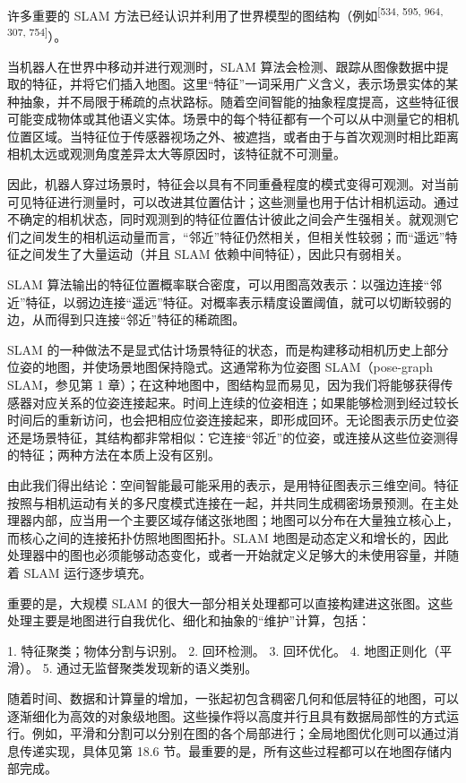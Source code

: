 许多重要的 SLAM 方法已经认识并利用了世界模型的图结构（例如\textsuperscript{[534, 595, 964, 307, 754]}）。

当机器人在世界中移动并进行观测时，SLAM 算法会检测、跟踪从图像数据中提取的特征，并将它们插入地图。这里“特征”一词采用广义含义，表示场景实体的某种抽象，并不局限于稀疏的点状路标。随着空间智能的抽象程度提高，这些特征很可能变成物体或其他语义实体。场景中的每个特征都有一个可以从中测量它的相机位置区域。当特征位于传感器视场之外、被遮挡，或者由于与首次观测时相比距离相机太远或观测角度差异太大等原因时，该特征就不可测量。

因此，机器人穿过场景时，特征会以具有不同重叠程度的模式变得可观测。对当前可见特征进行测量时，可以改进其位置估计；这些测量也用于估计相机运动。通过不确定的相机状态，同时观测到的特征位置估计彼此之间会产生强相关。就观测它们之间发生的相机运动量而言，“邻近”特征仍然相关，但相关性较弱；而“遥远”特征之间发生了大量运动（并且 SLAM 依赖中间特征），因此只有弱相关。

SLAM 算法输出的特征位置概率联合密度，可以用图高效表示：以强边连接“邻近”特征，以弱边连接“遥远”特征。对概率表示精度设置阈值，就可以切断较弱的边，从而得到只连接“邻近”特征的稀疏图。

SLAM 的一种做法不是显式估计场景特征的状态，而是构建移动相机历史上部分位姿的地图，并使场景地图保持隐式。这通常称为位姿图 SLAM（pose-graph SLAM，参见第 1 章）；在这种地图中，图结构显而易见，因为我们将能够获得传感器对应关系的位姿连接起来。时间上连续的位姿相连；如果能够检测到经过较长时间后的重新访问，也会把相应位姿连接起来，即形成回环。无论图表示历史位姿还是场景特征，其结构都非常相似：它连接“邻近”的位姿，或连接从这些位姿测得的特征；两种方法在本质上没有区别。

由此我们得出结论：空间智能最可能采用的表示，是用特征图表示三维空间。特征按照与相机运动有关的多尺度模式连接在一起，并共同生成稠密场景预测。在主处理器内部，应当用一个主要区域存储这张地图；地图可以分布在大量独立核心上，而核心之间的连接拓扑仿照地图图拓扑。SLAM 地图是动态定义和增长的，因此处理器中的图也必须能够动态变化，或者一开始就定义足够大的未使用容量，并随着 SLAM 运行逐步填充。

重要的是，大规模 SLAM 的很大一部分相关处理都可以直接构建进这张图。这些处理主要是地图进行自我优化、细化和抽象的“维护”计算，包括：

1. 特征聚类；物体分割与识别。
2. 回环检测。
3. 回环优化。
4. 地图正则化（平滑）。
5. 通过无监督聚类发现新的语义类别。

随着时间、数据和计算量的增加，一张起初包含稠密几何和低层特征的地图，可以逐渐细化为高效的对象级地图。这些操作将以高度并行且具有数据局部性的方式运行。例如，平滑和分割可以分别在图的各个局部进行；全局地图优化则可以通过消息传递实现，具体见第 18.6 节。最重要的是，所有这些过程都可以在地图存储内部完成。

